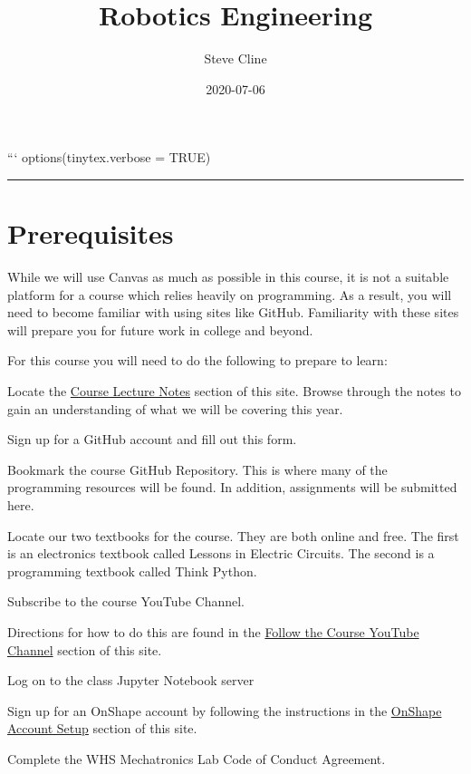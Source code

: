 \documentclass[
]{book}
\title{Robotics Engineering}
\author{Steve Cline}
\date{2020-07-06}
\begin{document}
\maketitle

{
\setcounter{tocdepth}{1}
\tableofcontents
}
```
options(tinytex.verbose = TRUE)

\begin{center}\rule{0.5\linewidth}{0.5pt}\end{center}

\hypertarget{prerequisites}{%
\chapter{Prerequisites}\label{prerequisites}}

While we will use Canvas as much as possible in this course, it is not a suitable platform for a course which relies heavily on programming. As a result, you will need to become familiar with using sites like GitHub. Familiarity with these sites will prepare you for future work in college and beyond.

For this course you will need to do the following to prepare to learn:

Locate the \protect\hyperlink{course-lecture-notes}{Course Lecture Notes} section of this site. Browse through the notes to gain an understanding of what we will be covering this year.

Sign up for a GitHub account and fill out this form.

Bookmark the course GitHub Repository. This is where many of the programming resources will be found. In addition, assignments will be submitted here.

Locate our two textbooks for the course. They are both online and free. The first is an electronics textbook called Lessons in Electric Circuits. The second is a programming textbook called Think Python.

Subscribe to the course YouTube Channel.

Directions for how to do this are found in the \protect\hyperlink{follow-the-course-youtube-channel}{Follow the Course YouTube Channel} section of this site.

Log on to the class Jupyter Notebook server

Sign up for an OnShape account by following the instructions in the \protect\hyperlink{onshape-account-setup}{OnShape Account Setup} section of this site.

Complete the WHS Mechatronics Lab Code of Conduct Agreement.
\end{document}
